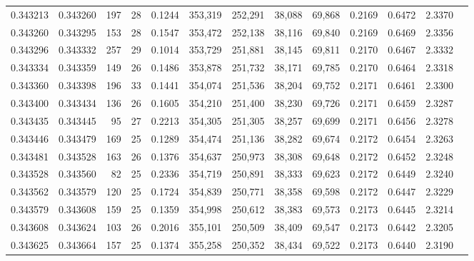 \begin{tabular}{rrrrrrrrrrrrr}
0.343213 & 0.343260 &   197 &  28 &                                     0.1244 & 353,319 & 252,291 &  38,088 &  69,868 & 0.2169 & 0.6472 & 2.3370 \\
0.343260 & 0.343295 &   153 &  28 &                                     0.1547 & 353,472 & 252,138 &  38,116 &  69,840 & 0.2169 & 0.6469 & 2.3356 \\
0.343296 & 0.343332 &   257 &  29 &                                     0.1014 & 353,729 & 251,881 &  38,145 &  69,811 & 0.2170 & 0.6467 & 2.3332 \\
0.343334 & 0.343359 &   149 &  26 &                                     0.1486 & 353,878 & 251,732 &  38,171 &  69,785 & 0.2170 & 0.6464 & 2.3318 \\
0.343360 & 0.343398 &   196 &  33 &                                     0.1441 & 354,074 & 251,536 &  38,204 &  69,752 & 0.2171 & 0.6461 & 2.3300 \\
0.343400 & 0.343434 &   136 &  26 &                                     0.1605 & 354,210 & 251,400 &  38,230 &  69,726 & 0.2171 & 0.6459 & 2.3287 \\
0.343435 & 0.343445 &    95 &  27 &                                     0.2213 & 354,305 & 251,305 &  38,257 &  69,699 & 0.2171 & 0.6456 & 2.3278 \\
0.343446 & 0.343479 &   169 &  25 &                                     0.1289 & 354,474 & 251,136 &  38,282 &  69,674 & 0.2172 & 0.6454 & 2.3263 \\
0.343481 & 0.343528 &   163 &  26 &                                     0.1376 & 354,637 & 250,973 &  38,308 &  69,648 & 0.2172 & 0.6452 & 2.3248 \\
0.343528 & 0.343560 &    82 &  25 &                                     0.2336 & 354,719 & 250,891 &  38,333 &  69,623 & 0.2172 & 0.6449 & 2.3240 \\
0.343562 & 0.343579 &   120 &  25 &                                     0.1724 & 354,839 & 250,771 &  38,358 &  69,598 & 0.2172 & 0.6447 & 2.3229 \\
0.343579 & 0.343608 &   159 &  25 &                                     0.1359 & 354,998 & 250,612 &  38,383 &  69,573 & 0.2173 & 0.6445 & 2.3214 \\
0.343608 & 0.343624 &   103 &  26 &                                     0.2016 & 355,101 & 250,509 &  38,409 &  69,547 & 0.2173 & 0.6442 & 2.3205 \\
0.343625 & 0.343664 &   157 &  25 &                                     0.1374 & 355,258 & 250,352 &  38,434 &  69,522 & 0.2173 & 0.6440 & 2.3190 \\

\end{tabular}
